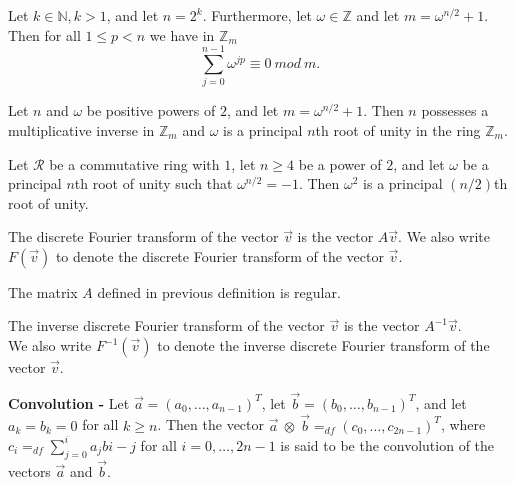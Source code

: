 \documentclass[a4paper]{article}
\begin{document}
\begin{samepage}
\begin{lemma}
Let $k \in \mathbb{N}, k > 1$, and let $n = 2^{k}$. Furthermore, let $\omega \in \mathbb{Z}$ and let $m = \omega^{n/2} + 1$. Then for all $1 \leq p < n$ we have in $\mathbb{Z}_{m}$
$$\sum_{j=0}^{n-1}\omega^{jp} \equiv 0\ mod\ m.$$
\end{lemma}
\end{samepage}


\begin{theorem}
Let $n$ and $\omega$ be positive powers of $2$, and let $m = \omega^{n/2} + 1$. Then $n$ possesses a multiplicative inverse in $\mathbb{Z}_{m}$ and $\omega$ is a principal $n$th root of unity in the ring $\mathbb{Z}_{m}$.
\end{theorem}


\begin{theorem}
Let $\mathcal{R}$ be a commutative ring with $1$, let $n \geq 4$ be a power of $2$, and let $\omega$ be a principal $n$th root of unity such that $\omega^{n/2} = -1$. Then $\omega^{2}$ is a principal $(n/2)$th root of unity.
\end{theorem}


\begin{definition}
The discrete Fourier transform of the vector $\vec{v}$ is the vector $A\vec{v}$. We also write $F(\vec{v})$ to denote the discrete Fourier transform of the vector $\vec{v}$.
\end{definition}


\begin{theorem}
The matrix $A$ defined in previous definition is regular.
\end{theorem}


\begin{definition}
The inverse discrete Fourier transform of the vector $\vec{v}$ is the vector $A^{-1}\vec{v}$. \\
We also write $F^{-1}(\vec{v})$ to denote the inverse discrete Fourier transform of the vector $\vec{v}$.
\end{definition}


\begin{definition}
\textbf{Convolution -} Let $\vec{a} = (a_{0}, \ldots, a_{n-1})^{T}$, let $\vec{b} = (b_{0}, \ldots, b_{n-1})^{T}$, and let $a_{k} = b_{k} = 0$ for all $k \geq n$. Then the vector $\vec{a}\ \otimes\ \vec{b} =_{df} (c_{0}, \ldots, c_{2n - 1})^{T}$, where $c_{i} =_{df} \sum_{j=0}^{i}a_{j}b{i-j}$ for all $i = 0, \ldots, 2n -1$ is said to be the convolution of the vectors $\vec{a}$ and $\vec{b}$.
\end{definition}
\end{document}

